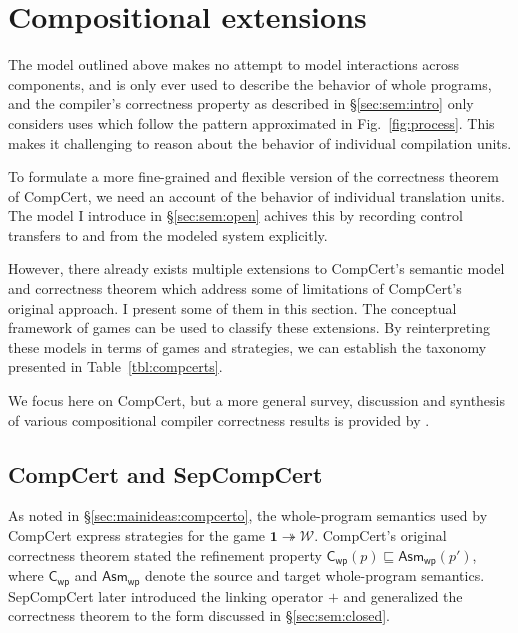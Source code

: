 \documentclass[draft,11pt]{report}
\theoremstyle{definition}
\newcommand{\kw}[1]{\ensuremath{ \mathsf{#1} }}
\newcommand{\refby}{\sqsubseteq} %
\begin{document}


\section{Compositional extensions} \label{sec:compcert-ext} %

The model outlined above
makes no attempt to model interactions across components,
and is only ever used to
describe the behavior of whole programs,
and the compiler's correctness property
as described in \S\ref{sec:sem:intro}
only considers uses which follow
the pattern approximated in Fig.~\ref{fig:process}.
This makes it challenging to reason about
the behavior of individual compilation units.

To formulate a more fine-grained and flexible
version of the correctness theorem of CompCert,
we need an account of
the behavior of individual translation units.
The model I introduce in \S\ref{sec:sem:open}
achives this by recording control transfers
to and from the modeled system explicitly.

However,
there already exists multiple extensions
to CompCert's semantic model
and correctness theorem
which address some of limitations
of CompCert's original approach.
I present some of them in this section.
The conceptual framework of games
can be used to classify these extensions.
By reinterpreting these models
in terms of games and strategies,
we can establish the taxonomy presented in
Table~\ref{tbl:compcerts}.

We focus here on CompCert,
but a more general survey,
discussion and synthesis of various
compositional compiler correctness results
is provided by \citet{next700}.

\subsection{CompCert and SepCompCert} %

As noted in \S\ref{sec:mainideas:compcerto},
the whole-program semantics used by CompCert
express strategies for the game
$\mathbf{1} \twoheadrightarrow \mathcal{W}$.
CompCert's original correctness theorem
stated the refinement property
$\kw{C}_\kw{wp}(p) \refby \kw{Asm}_\kw{wp}(p')$,
where $\kw{C}_\kw{wp}$ and $\kw{Asm}_\kw{wp}$
denote the source and target whole-program semantics.
SepCompCert \citep{sepcompcert}
later introduced the linking operator $+$
and generalized the correctness theorem to
the form discussed in \S\ref{sec:sem:closed}.
\end{document}

